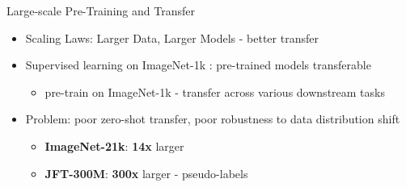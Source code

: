\begin{frame}{Large-scale Pre-Training and Transfer}
\protect\hypertarget{large-scale-pre-training-and-transfer-4}{}
\begin{itemize}
\tightlist
\item
  Scaling Laws: Larger Data, Larger Models - better transfer
\item
  Supervised learning on ImageNet-1k : pre-trained models transferable

  \begin{itemize}
  \tightlist
  \item
    pre-train on ImageNet-1k - transfer across various downstream tasks
  \end{itemize}
\item
  Problem: poor zero-shot transfer, poor robustness to data distribution
  shift

  \begin{itemize}
  \tightlist
  \item
    \textbf{ImageNet-21k}: \textbf{14x} larger
  \item
    \textbf{JFT-300M}: \textbf{300x} larger - pseudo-labels
  \end{itemize}
\end{itemize}

\end{frame}

